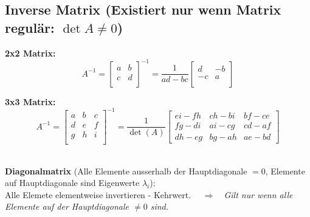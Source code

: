 \subsection{Inverse Matrix \small{(Existiert nur wenn Matrix regulär: $\det A \neq 0$)}}
\begin{minipage}{7cm}
	\textbf{2x2 Matrix:}    
	$$ A^{-1} = \begin{bmatrix} a & b \\ c & d \\ \end{bmatrix}^{-1} = \frac{1}{ad
	- bc} \begin{bmatrix} d & -b \\ -c & a \\ \end{bmatrix} $$
\end{minipage}
\begin{minipage}{11cm}
	\textbf{3x3 Matrix:}
  $$  A^{-1} = \begin{bmatrix} a & b & c\\ d & e & f \\ g & h & i \\ \end{bmatrix}^{-1} =
  \frac{1}{\det(A)} \begin{bmatrix} ei - fh & ch - bi & bf - ce \\ fg - di & ai
  - cg & cd - af \\ dh - eg & bg - ah & ae - bd \end{bmatrix} $$
\end{minipage}\\

\textbf{Diagonalmatrix} (Alle Elemente ausserhalb der Hauptdiagonale $= 0$, Elemente auf
Hauptdiagonale sind Eigenwerte $\lambda_i$): \\ 
Alle Elemete elementweise invertieren - Kehrwert. $\quad \Rightarrow \quad $\textit{Gilt nur wenn
alle Elemente auf der Hauptdiagonale $\neq 0$ sind.}\\

